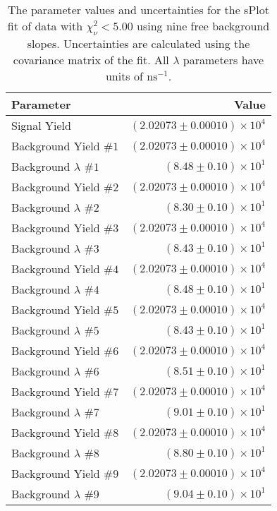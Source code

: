 
\begin{table}[ht]
    \begin{center}
        \begin{tabular}{lr}\toprule
            Parameter & Value \\\midrule
            Signal Yield & $(2.02073 \pm 0.00010) \times 10^{4}$ \\
            Background Yield $\#1$ & $(2.02073 \pm 0.00010) \times 10^{4}$ \\
            Background $\lambda$ $\#1$ & $(8.48 \pm 0.10) \times 10^{1}$ \\
            Background Yield $\#2$ & $(2.02073 \pm 0.00010) \times 10^{4}$ \\
            Background $\lambda$ $\#2$ & $(8.30 \pm 0.10) \times 10^{1}$ \\
            Background Yield $\#3$ & $(2.02073 \pm 0.00010) \times 10^{4}$ \\
            Background $\lambda$ $\#3$ & $(8.43 \pm 0.10) \times 10^{1}$ \\
            Background Yield $\#4$ & $(2.02073 \pm 0.00010) \times 10^{4}$ \\
            Background $\lambda$ $\#4$ & $(8.48 \pm 0.10) \times 10^{1}$ \\
            Background Yield $\#5$ & $(2.02073 \pm 0.00010) \times 10^{4}$ \\
            Background $\lambda$ $\#5$ & $(8.43 \pm 0.10) \times 10^{1}$ \\
            Background Yield $\#6$ & $(2.02073 \pm 0.00010) \times 10^{4}$ \\
            Background $\lambda$ $\#6$ & $(8.51 \pm 0.10) \times 10^{1}$ \\
            Background Yield $\#7$ & $(2.02073 \pm 0.00010) \times 10^{4}$ \\
            Background $\lambda$ $\#7$ & $(9.01 \pm 0.10) \times 10^{1}$ \\
            Background Yield $\#8$ & $(2.02073 \pm 0.00010) \times 10^{4}$ \\
            Background $\lambda$ $\#8$ & $(8.80 \pm 0.10) \times 10^{1}$ \\
            Background Yield $\#9$ & $(2.02073 \pm 0.00010) \times 10^{4}$ \\
            Background $\lambda$ $\#9$ & $(9.04 \pm 0.10) \times 10^{1}$ \\\bottomrule
        \end{tabular}
        \caption{The parameter values and uncertainties for the sPlot fit of data with $\chi^2_\nu < 5.00$ using nine free background slopes. Uncertainties are calculated using the covariance matrix of the fit. All $\lambda$ parameters have units of $\si{\nano\second}^{-1}$.}\label{tab:splot-fit-results-chisqdof-5.00-free-9}
    \end{center}
\end{table}
